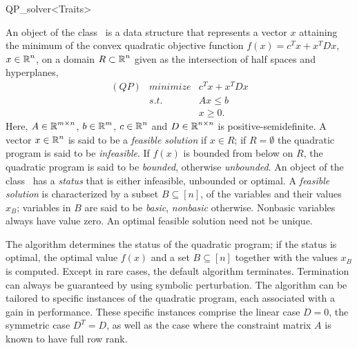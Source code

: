 
\begin{ccRefClass}{QP_solver<Traits>}

\ccDefinition
An object of the class \ccRefName\ is a data structure that
represents a vector $x$ attaining the minimum of the convex quadratic objective
function $f(x)=c^{T}x+x^{T}Dx$, $x \in \mbox{$\mathbb R$}^{n}$, on a domain $R \subset \mbox{$\mathbb R$}^{n}$
given as the intersection of half spaces and hyperplanes,
\begin{eqnarray*}
(QP)&minimize & c^{T}x+x^{T}Dx \\
&s.t.     & Ax \leq b \\
&& x \geq 0.
\end{eqnarray*}
Here, $A \in \mbox{$\mathbb R$}^{m \times n}$, $b \in \mbox{$\mathbb R$}^{m}$, $c \in \mbox{$\mathbb R$}^{n}$ and
$D \in \mbox{$\mathbb R$}^{n \times n}$ is positive-semidefinite.
A vector $x \in \mbox{$\mathbb R$}^{n}$ is said to be a \emph{feasible solution}
if $x \in R$; if $R=\emptyset$ the quadratic program is said to be
\emph{infeasible}. If $f(x)$ is bounded from
below on $R$, the quadratic program is said to be \emph{bounded}, otherwise
\emph{unbounded}. An object of the class \ccRefName\ has a \emph{status} that
is either infeasible, unbounded or optimal.  
A \emph{feasible solution} is characterized by a
subset $B\subseteq\left[n\right]$, of the variables
and their values $x_{B}$;
variables in $B$ are said to be \emph{basic}, \emph{nonbasic} otherwise. 
Nonbasic variables always have value zero. An optimal feasible solution
need not be unique.

The algorithm determines the status of the quadratic program; if the status is
optimal, the optimal value $f(x)$ and a set $B \subseteq \left[n\right]$
together with the values $x_{B}$ is computed. Except in rare
cases, the default algorithm terminates. Termination can always be guaranteed
by using symbolic perturbation. The algorithm can be tailored to specific
instances of the quadratic program, each associated with a gain in performance.
These specific
instances comprise the linear case $D=0$, the symmetric case $D^{T}=D$, as
well as the case where the constraint matrix $A$ is known to have full row rank.   


\end{ccRefClass}
